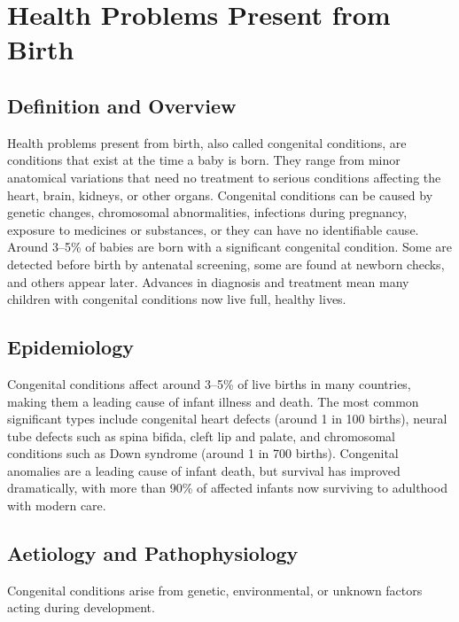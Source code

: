 \chapter{Health Problems Present from Birth}

\section*{Definition and Overview}
Health problems present from birth, also called congenital conditions, are conditions that exist at the time a baby is born. They range from minor anatomical variations that need no treatment to serious conditions affecting the heart, brain, kidneys, or other organs. Congenital conditions can be caused by genetic changes, chromosomal abnormalities, infections during pregnancy, exposure to medicines or substances, or they can have no identifiable cause. Around 3--5\% of babies are born with a significant congenital condition. Some are detected before birth by antenatal screening, some are found at newborn checks, and others appear later. Advances in diagnosis and treatment mean many children with congenital conditions now live full, healthy lives.

\section*{Epidemiology}
Congenital conditions affect around 3--5\% of live births in many countries, making them a leading cause of infant illness and death. The most common significant types include congenital heart defects (around 1 in 100 births), neural tube defects such as spina bifida, cleft lip and palate, and chromosomal conditions such as Down syndrome (around 1 in 700 births). Congenital anomalies are a leading cause of infant death, but survival has improved dramatically, with more than 90\% of affected infants now surviving to adulthood with modern care.

\section*{Aetiology and Pathophysiology}
Congenital conditions arise from genetic, environmental, or unknown factors acting during development.

